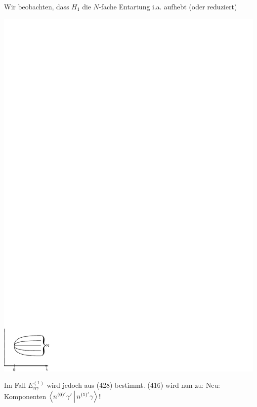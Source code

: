 \documentclass[a4paper]{scrartcl}
\begin{document}
Wir beobachten, dass $H_1$ die $N$-fache Entartung i.a. aufhebt (oder reduziert)
\begin{center}
\includegraphics{431EntartRed}
\end{center}
Im Fall $E_{n \gamma}^{(1)}$ wird jedoch aus (428) bestimmt. (416) wird nun zu:
Neu: Komponenten $\Braket{ n^{(0)'} \gamma' | n^{(1)'} \gamma}$!
\end{document}
